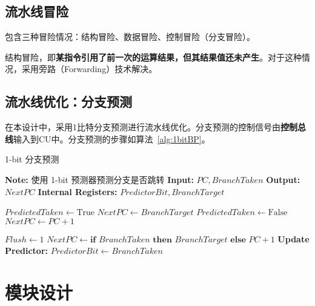 \documentclass[lang=cn,a4paper,newtx]{elegantpaper}
\begin{document}
\subsection{流水线冒险}
包含三种冒险情况：结构冒险、数据冒险、控制冒险（分支冒险）。\cite{zhihu453232311}

结构冒险，即\textbf{某指令引用了前一次的运算结果，但其结果值还未产生}。对于这种情况，采用旁路（Forwarding）技术解决。
\subsection{流水线优化：分支预测}
在本设计中，采用1比特分支预测进行流水线优化。分支预测的控制信号由\textbf{控制总线}输入到CU中。分支预测的步骤如算法~\ref{alg:1bitBP}。

\begin{algorithm}[htbp]
  \caption{1-bit 分支预测}
  \label{alg:1bitBP}
  \begin{algorithmic}[1]
  \State \textbf{Note:} 使用 1-bit 预测器预测分支是否跳转
  \State \textbf{Input:} $PC, BranchTaken$
  \State \textbf{Output:} $NextPC$
  \State \textbf{Internal Registers:} $PredictorBit, BranchTarget$

          \State $PredictedTaken \gets \text{True}$
          \State $NextPC \gets BranchTarget$
      \Else
          \State $PredictedTaken \gets \text{False}$
          \State $NextPC \gets PC + 1$
      \EndIf
  \EndProcedure

        
          \State $Flush \gets 1$  
          \State $NextPC \gets \textbf{if } BranchTaken \textbf{ then } BranchTarget \textbf{ else } PC + 1$
      \EndIf
      \State \textbf{Update Predictor:}
      \State $PredictorBit \gets BranchTaken$  
  \EndProcedure
  \end{algorithmic}
\end{algorithm}



\section{模块设计}
\end{document}
